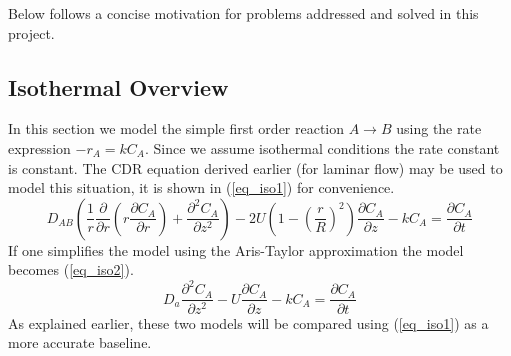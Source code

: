 \documentclass[11pt,fleqn]{article}
\theoremstyle{defstyle}
\begin{document}
Below follows a concise motivation for problems addressed and solved in this project. 
\subsection{Isothermal Overview}
In this section we model the simple first order reaction $A \rightarrow B$ using the rate expression $-r_A=kC_A$. Since we assume isothermal conditions the rate constant is constant. The CDR equation derived earlier (for laminar flow) may be used to model this situation, it is shown in (\ref{eq_iso1}) for convenience.
\begin{equation}
D_{AB}\left(\frac{1}{r}\frac{\partial}{\partial r}\left(r\frac{\partial C_A}{\partial r}\right) + \frac{\partial^2 C_A}{\partial z^2}\right) - 2U\left(1-\left(\frac{r}{R}\right)^2\right)\frac{\partial C_A}{\partial z} - kC_A = \frac{\partial C_A}{\partial t}
\label{eq_iso1}
\end{equation} 
If one simplifies the model using the Aris-Taylor approximation the model becomes (\ref{eq_iso2}).
\begin{equation}
D_a \frac{\partial^2 C_A}{\partial z^2} - U \frac{\partial C_A}{\partial z} - kC_A = \frac{\partial C_A}{\partial t}
\label{eq_iso2}
\end{equation}
As explained earlier, these two models will be compared using (\ref{eq_iso1}) as a more accurate baseline.
\end{document}
